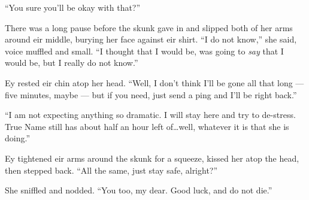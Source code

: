 ``You sure you'll be okay with that?''

There was a long pause before the skunk gave in and slipped both of her arms around eir middle, burying her face against eir shirt. ``I do not know,'' she said, voice muffled and small. ``I thought that I would be, was going to \emph{say} that I would be, but I really do not know.''

Ey rested eir chin atop her head. ``Well, I don't think I'll be gone all that long — five minutes, maybe — but if you need, just send a ping and I'll be right back.''

``I am not expecting anything so dramatic. I will stay here and try to de-stress. True Name still has about half an hour left of\ldots well, whatever it is that she is doing.''

Ey tightened eir arms around the skunk for a squeeze, kissed her atop the head, then stepped back. ``All the same, just stay safe, alright?''

She sniffled and nodded. ``You too, my dear. Good luck, and do not die.''
